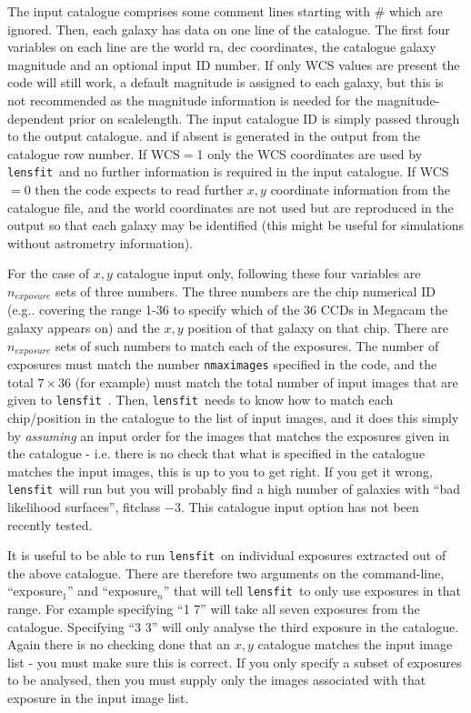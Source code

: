 \documentclass{article}
\def\lensfit{{\tt lensfit}\ }
\begin{document}
The input catalogue comprises some
comment lines starting with \# which are ignored.  Then, each galaxy has data on one line
of the catalogue.  The first four variables on each line are the world ra, dec coordinates,
the catalogue galaxy magnitude and an optional input ID number.
If only WCS values are present
the code will still work, a default magnitude is assigned to each galaxy, but this is not
recommended as the magnitude
information is needed for the magnitude-dependent prior on scalelength.  
The input catalogue ID is simply passed through to the output catalogue.
and if absent is generated in the output from the catalogue row number.
If WCS$=$1 only the WCS coordinates are used by \lensfit and no further information
is required in the input catalogue.
If WCS$=$0 then the code expects to read further $x, y$ coordinate
information from the catalogue file, and 
the world coordinates are not used but are reproduced in the output so that each galaxy may be 
identified (this might be useful for simulations without astrometry information).

For the case of $x, y$ catalogue input only, following these four variables are 
$n_{exposure}$ sets of three numbers.
The three numbers are
the chip numerical ID (e.g.. covering the range 1-36 to specify which of the 36 CCDs 
in Megacam the 
galaxy appears on) and the $x, y $ position of that galaxy on that chip.  There are 
$n_{exposure}$ sets
of such numbers to match each of the exposures.  The number of exposures must match the 
number {\tt nmaximages} specified in the code, and the total $7 \times 36$ (for example) must match the 
total number of input images that are given to \lensfit.  Then, \lensfit needs to know how
to match each chip/position in the catalogue to the list of input images, and it does this
simply by {\em assuming} an input order for the images that matches the exposures given
in the catalogue - i.e. there is no check that what is specified in the catalogue matches
the input images, this is up to you to get right.  If you get it wrong, \lensfit will
run but you will probably find a high number of galaxies with ``bad likelihood surfaces'',
fitclass $-3$.  This catalogue input option has not been recently tested.

It is useful to be able to run \lensfit on individual exposures extracted out of the above
catalogue.  There are therefore two arguments on the command-line, ``exposure$_1$'' and
``exposure$_n$'' that will tell \lensfit to only use exposures in that range.  For example
specifying ``1 7'' will take all seven exposures from the catalogue.  Specifying ``3 3'' will
only analyse the third exposure in the catalogue.  Again there is no checking done that
an $x, y$ catalogue matches the input image list - you must make sure this is correct.  If you
only specify a subset of exposures to be analysed, then you must supply only the images
associated with that exposure in the input image list.
\end{document}

